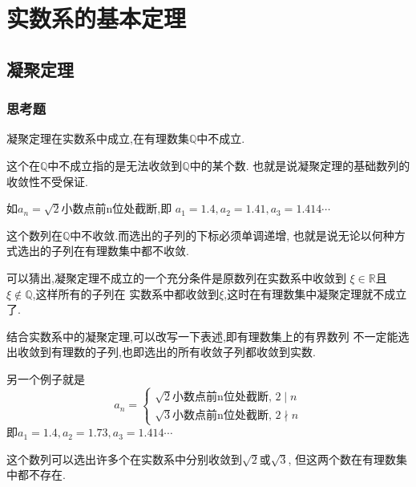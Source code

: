 \documentclass[cn]{elegantbook}
\begin{document}
\tableofcontents

    \chapter{实数系的基本定理}
    \section{凝聚定理}
        \subsection{思考题}
            \begin{example}
                凝聚定理在实数系中成立,在有理数集$\mathbb{Q} $中不成立.
            \end{example}
            \begin{solution}
                这个在$\mathbb{Q}$中不成立指的是无法收敛到$\mathbb{Q}$中的某个数.
                也就是说凝聚定理的基础数列的收敛性不受保证.
                
                如$a_n=\sqrt{2}$小数点前n位处截断,即
                $a_1=1.4,a_2=1.41,a_3=1.414\cdots$

                这个数列在$\mathbb{Q}$中不收敛.而选出的子列的下标必须单调递增,
                也就是说无论以何种方式选出的子列在有理数集中都不收敛.

                可以猜出,凝聚定理不成立的一个充分条件是原数列在实数系中收敛到
                $\xi\in\mathbb{R}$且$\xi\notin\mathbb{Q}$,这样所有的子列在
                实数系中都收敛到$\xi$,这时在有理数集中凝聚定理就不成立了.

                结合实数系中的凝聚定理,可以改写一下表述,即有理数集上的有界数列
                不一定能选出收敛到有理数的子列,也即选出的所有收敛子列都收敛到实数.

                另一个例子就是
                \[a_n=\begin{cases}
                    \sqrt{2}\text{小数点前n位处截断},\, 2\mid  n\\
                    \sqrt{3}\text{小数点前n位处截断},\, 2\nmid n
                \end{cases}\]
                即$a_1=1.4,a_2=1.73,a_3=1.414\cdots$

                这个数列可以选出许多个在实数系中分别收敛到$\sqrt{2}$或$\sqrt{3}$,
                但这两个数在有理数集中都不存在.
            \end{solution}
\end{document}
